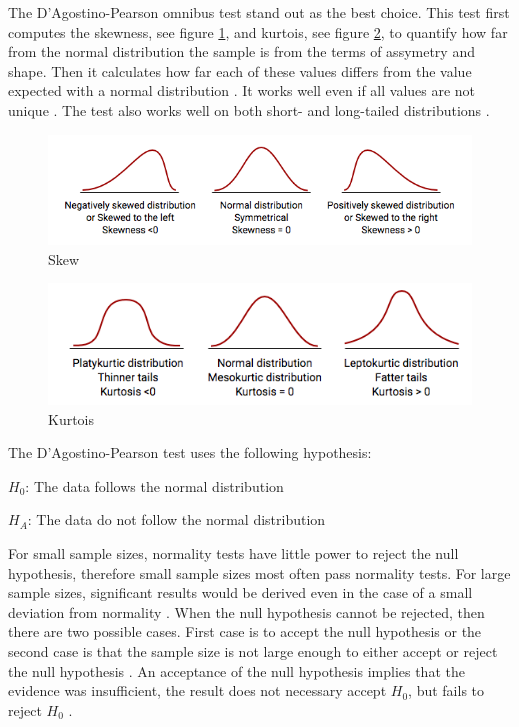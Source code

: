 The D'Agostino-Pearson omnibus test stand out as the best choice. This test first computes the skewness, see figure \ref{fig:skew}, and kurtois, see figure \ref{fig:kurtois}, to quantify how far from the normal distribution the sample is from the terms of assymetry and shape. Then it calculates how far each of these values differs from the value expected with a normal distribution \citep{Pearson2006}. It works well even if all values are not unique \citep{Motulsky2013}. The test also works well on both short- and long-tailed distributions \citep{Yap2011}. \newline  %

\begin{figure}[h!]
	\centering
	\includegraphics[width=0.7\linewidth]{"fig/skew"}
	\caption{Skew \citep{MedCalcSoftwarebvba2017}}
	\label{fig:skew}
\end{figure}

\begin{figure}[h!]
	\centering
	\includegraphics[width=0.7\linewidth]{fig/kurtois}
	\caption{Kurtois \citep{MedCalcSoftwarebvba2017}}
	\label{fig:kurtois}
\end{figure}


The D'Agostino-Pearson test uses the following hypothesis:\newline

\centerline{$H_{0}$: The data follows the normal distribution} 
\centerline{$H_{A}$: The data do not follow the normal distribution}

For small sample sizes, normality tests have little power to reject the null hypothesis, therefore small sample sizes most often pass normality tests. For large sample sizes, significant results would be derived even in the case of a small deviation from normality \citep{Pearson2006}. When the null hypothesis cannot be rejected, then there are two possible cases. First case is to accept the null hypothesis or the second case is that the sample size is not large enough to either accept or reject the null hypothesis \citep{ThePennsylvaniaStateUniversity2017}. An acceptance of the null hypothesis implies that the evidence was insufficient, the result does not necessary accept $H_{0}$, but fails to reject $H_{0}$ \citep{Walpole2012}.  

